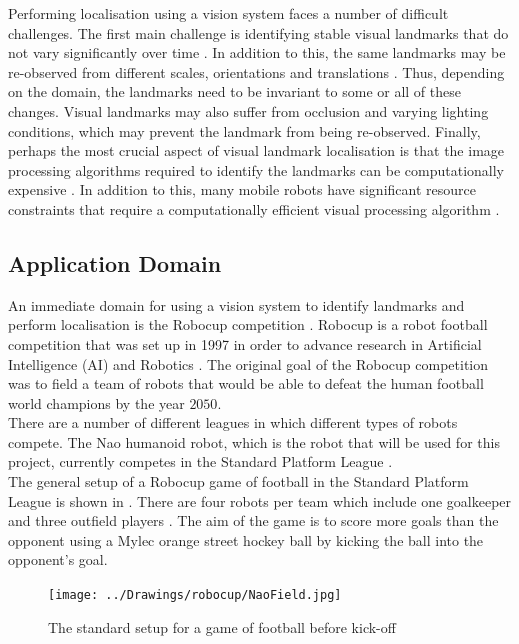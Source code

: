 Performing localisation using a vision system faces a number of difficult challenges. The first main challenge is identifying stable visual landmarks that do not vary significantly over time \citep{Davison2007, Se2002}. In addition to this, the same landmarks may be re-observed from different scales, orientations and translations \citep{Szeliski2010}. Thus, depending on the domain, the landmarks need to be invariant to some or all of these changes. Visual landmarks may also suffer from occlusion and varying lighting conditions, which may prevent the landmark from being re-observed. Finally, perhaps the most crucial aspect of visual landmark localisation is that the image processing algorithms required to identify the landmarks can be computationally expensive \citep{Juan2009}. In addition to this, many mobile robots have significant resource constraints that require a computationally efficient visual processing algorithm \citep{NaoHead}. \\

\subsection{Application Domain}
\label{sec:domain}
An immediate domain for using a vision system to identify landmarks and perform localisation is the Robocup competition \citep{irp}. Robocup is a robot football competition that was set up in 1997 in order to advance research in Artificial Intelligence (AI) and Robotics \citep{Robocup}. The original goal of the Robocup competition was to field a team of robots that would be able to defeat the human football world champions by the year $2050$.\\

There are a number of different leagues in which different types of robots compete. The Nao humanoid robot, which is the robot that will be used for this project, currently competes in the Standard Platform League \citep{StandardPlatform}.\\

The general setup of a Robocup game of football in the Standard Platform League is shown in . There are four robots per team which include one goalkeeper and three outfield players \citep{Rules}. The aim of the game is to score more goals than the opponent using a Mylec orange street hockey ball by kicking the ball into the opponent's goal.\\

\begin{figure}[h!] 
  \centering
    \texttt{[image: ../Drawings/robocup/NaoField.jpg]}
    \caption{The standard setup for a game of football before kick-off \citep{Rules}}
    \label{fig:naofield}
\end{figure}

